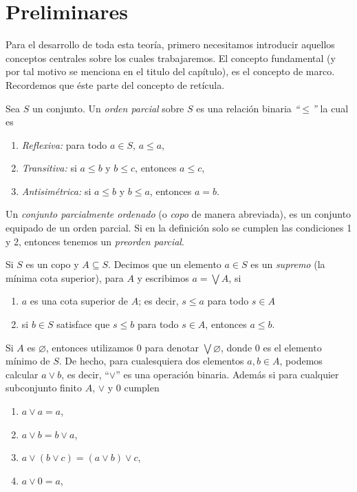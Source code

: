 \chapter{Preliminares}\label{Preliminares}

Para el desarrollo de toda esta teoría, primero necesitamos introducir aquellos conceptos centrales sobre los cuales trabajaremos. El concepto fundamental (y por tal motivo se menciona en el titulo del capítulo), es el concepto de marco. Recordemos que éste parte del concepto de retícula.\\

\begin{dfn}\label{Copo}
Sea $S$ un conjunto. Un \emph{orden parcial} sobre $S$ es una relación binaria \emph{``$\leq$''} la cual es 
\begin{enumerate}
\item \emph{Reflexiva:} para todo $a\in S$, $a\leq a$,
\item \emph{Transitiva:} si $a\leq b$ y $b\leq c$, entonces $a\leq c$,
\item \emph{Antisimétrica:} si $a\leq b$ y $b\leq a$, entonces $a=b$. 
\end{enumerate}
Un \emph{conjunto parcialmente ordenado} (o \emph{copo} de manera abreviada), es un conjunto equipado de un orden parcial. Si en la definición solo se cumplen las condiciones 1 y 2, entonces tenemos un \emph{preorden parcial}.
\end{dfn}

\begin{dfn}\label{Supremo}
Si $S$ es un copo y $A\subseteq S$. Decimos que un elemento $a\in S$ es un \emph{supremo} (la mínima cota superior), para $A$ y escribimos $a=\bigvee A$, si
\begin{enumerate}
\item $a$ es una cota superior de $A$; es decir, $s\leq a$ para todo $s\in A$
\item si $b\in S$ satisface que $s\leq b$ para todo $s\in A$, entonces $a\leq b$.
\end{enumerate}
\end{dfn}

Si $A$ es $\varnothing$, entonces utilizamos $0$ para denotar $\bigvee \varnothing$, donde $0$ es el elemento mínimo de $S$. De hecho, para cualesquiera dos elementos $a, b\in A$, podemos calcular $a\vee b$, es decir, ``$\vee$'' es una operación binaria. Además si para cualquier subconjunto finito $A$, $\vee$ y $0$ cumplen

\begin{enumerate}
    \item $a\vee a=a$,
    \item $a\vee b= b\vee a$,
    \item $a\vee (b\vee c)=(a\vee b) \vee c$,
    \item $a\vee 0=a$,
\end{enumerate}

